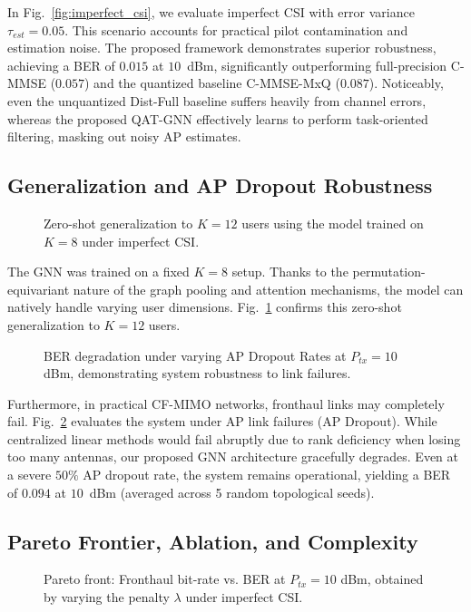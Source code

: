 In Fig.~\ref{fig:imperfect_csi}, we evaluate imperfect CSI with error variance $\tau_{est}=0.05$. This scenario accounts for practical pilot contamination and estimation noise. The proposed framework demonstrates superior robustness, achieving a BER of $0.015$ at $10$~dBm, significantly outperforming full-precision C-MMSE ($0.057$) and the quantized baseline C-MMSE-MxQ ($0.087$). Noticeably, even the unquantized Dist-Full baseline suffers heavily from channel errors, whereas the proposed QAT-GNN effectively learns to perform task-oriented filtering, masking out noisy AP estimates.

\subsection{Generalization and AP Dropout Robustness}
\begin{figure}[t]
    \centering
    
    \caption{Zero-shot generalization to $K=12$ users using the model trained on $K=8$ under imperfect CSI.}
    \label{fig:generalization}
\end{figure}

The GNN was trained on a fixed $K=8$ setup. Thanks to the permutation-equivariant nature of the graph pooling and attention mechanisms, the model can natively handle varying user dimensions. Fig.~\ref{fig:generalization} confirms this zero-shot generalization to $K=12$ users. 

\begin{figure}[t]
    \centering
    
    \caption{BER degradation under varying AP Dropout Rates at $P_{tx}=10$ dBm, demonstrating system robustness to link failures.}
    \label{fig:dropout}
\end{figure}

Furthermore, in practical CF-MIMO networks, fronthaul links may completely fail. Fig.~\ref{fig:dropout} evaluates the system under AP link failures (AP Dropout). While centralized linear methods would fail abruptly due to rank deficiency when losing too many antennas, our proposed GNN architecture gracefully degrades. Even at a severe $50\%$ AP dropout rate, the system remains operational, yielding a BER of $0.094$ at $10$~dBm (averaged across 5 random topological seeds).

\subsection{Pareto Frontier, Ablation, and Complexity}
\begin{figure}[t]
    \centering
    
    \caption{Pareto front: Fronthaul bit-rate vs. BER at $P_{tx}=10$ dBm, obtained by varying the penalty $\lambda$ under imperfect CSI.}
    \label{fig:pareto}
\end{figure}

